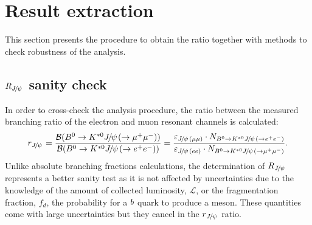 \section{Result extraction}
\label{sec:RKst_result}

This section presents the procedure to obtain the \RKst ratio together with
methods to check robustness of the analysis.


\subsection{$R_{\jpsi}$ sanity check}
\label{sec:Rjpsi}

In order to cross-check the analysis procedure, the ratio between the
measured branching ratio of the electron and muon resonant channels is calculated:
%
\begin{equation}
r_{\jpsi} = \frac{\BR(\Bz\to\Kstarz\jpsi(\to \mumu))} {\BR(\Bz\to\Kstarz\jpsi(\to \epem))} 
= \frac{\varepsilon_{\jpsi(\mu\mu)} \cdot N_{\Bz\to\Kstarz\jpsi(\to \epem)}}{\varepsilon_{\jpsi(ee)} 
\cdot N_{\Bz\to\Kstarz\jpsi(\to \mumu)}}.
\end{equation}
%
Unlike absolute branching fractions calculations, the determination of $R_{\jpsi}$ represents a better
sanity test as it is not affected by uncertainties due to the knowledge of the amount of collected 
luminosity, $\mathcal{L}$, or the fragmentation fraction, $f_d$, the probability for a ${b}$
quark to produce a \Bz meson. These quantities come with large uncertainties but they cancel
in the $r_{\jpsi}$ ratio.

%
%



